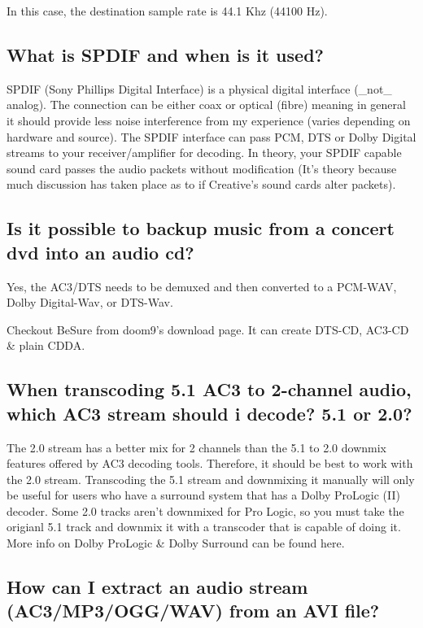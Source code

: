 ﻿\documentclass[12pt]{article}
\begin{document}
In this case, the destination sample rate is 44.1 Khz (44100 Hz).

\subsection{What is SPDIF and when is it used?}

SPDIF (Sony Phillips Digital Interface) is a physical digital interface (\_not\_ analog). The
connection can be either coax or optical (fibre) meaning in general it should provide less noise
interference from my experience (varies depending on hardware and source). The SPDIF interface can
pass PCM, DTS or Dolby Digital streams to your receiver/amplifier for decoding. In theory, your
SPDIF capable sound card passes the audio packets without modification (It's theory because much
discussion has taken place as to if Creative's sound cards alter packets).

\subsection{Is it possible to backup music from a concert dvd into an audio cd?}

Yes, the AC3/DTS needs to be demuxed and then converted to a PCM-WAV, Dolby Digital-Wav, or DTS-Wav.

Checkout BeSure from doom9's download page. It can create DTS-CD, AC3-CD \& plain CDDA.

\subsection{When transcoding 5.1 AC3 to 2-channel audio, which AC3 stream should i decode? 5.1 or 2.0?}

The 2.0 stream has a better mix for 2 channels than the 5.1 to 2.0 downmix features offered by AC3
decoding tools. Therefore, it should be best to work with the 2.0 stream. Transcoding the 5.1 stream
and downmixing it manually will only be useful for users who have a surround system that has a Dolby
ProLogic (II) decoder. Some 2.0 tracks aren't downmixed for Pro Logic, so you must take the origianl
5.1 track and downmix it with a transcoder that is capable of doing it. More info on Dolby ProLogic
\& Dolby Surround can be found here.

\subsection{How can I extract an audio stream (AC3/MP3/OGG/WAV) from an AVI file?}
\end{document}
